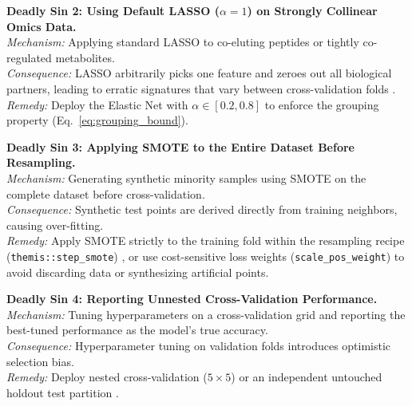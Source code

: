 \documentclass[11pt,oneside]{book}
\begin{document}
\begin{pitfallbox}[top=3pt, bottom=3pt, before skip=3pt, after skip=3pt]
\textbf{Deadly Sin 2: Using Default LASSO ($\alpha=1$) on Strongly Collinear Omics Data.}\\
\textit{Mechanism:} Applying standard LASSO to co-eluting peptides or tightly co-regulated metabolites.\\
\textit{Consequence:} LASSO arbitrarily picks one feature and zeroes out all biological partners, leading to erratic signatures that vary between cross-validation folds \cite{zou2005regularization}.\\
\textit{Remedy:} Deploy the Elastic Net with $\alpha \in [0.2, 0.8]$ to enforce the grouping property (Eq.~\ref{eq:grouping_bound}).
\end{pitfallbox}

\begin{pitfallbox}[top=3pt, bottom=3pt, before skip=3pt, after skip=3pt]
\textbf{Deadly Sin 3: Applying SMOTE to the Entire Dataset Before Resampling.}\\
\textit{Mechanism:} Generating synthetic minority samples using SMOTE on the complete dataset before cross-validation.\\
\textit{Consequence:} Synthetic test points are derived directly from training neighbors, causing over-fitting.\\
\textit{Remedy:} Apply SMOTE strictly to the training fold within the resampling recipe (\texttt{themis::step\_smote}) \cite{chawla2002smote}, or use cost-sensitive loss weights (\texttt{scale\_pos\_weight}) to avoid discarding data or synthesizing artificial points.
\end{pitfallbox}

\begin{pitfallbox}[top=3pt, bottom=3pt, before skip=3pt, after skip=3pt]
\textbf{Deadly Sin 4: Reporting Unnested Cross-Validation Performance.}\\
\textit{Mechanism:} Tuning hyperparameters on a cross-validation grid and reporting the best-tuned performance as the model's true accuracy.\\
\textit{Consequence:} Hyperparameter tuning on validation folds introduces optimistic selection bias.\\
\textit{Remedy:} Deploy nested cross-validation ($5 \times 5$) or an independent untouched holdout test partition \cite{kuhn2013applied}.
\end{pitfallbox}
\end{document}
